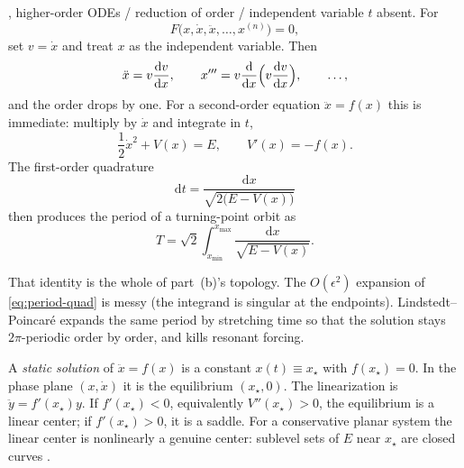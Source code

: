\documentclass[11pt,a4paper]{article}
\begin{document}
\begin{definition}
\label{def:reduce-autonomous}
\cite{grade2ode}, higher-order ODEs / reduction of order / independent variable \(t\) absent. For
\[
F\bigl(x,\dot x,\ddot x,\ldots,x^{(n)}\bigr)=0,
\]
set \(v=\dot x\) and treat \(x\) as the independent variable. Then
\[
\ddot x=v\frac{\mathrm{d}v}{\mathrm{d}x},\qquad
x'''=v\frac{\mathrm{d}}{\mathrm{d}x}\Bigl(v\frac{\mathrm{d}v}{\mathrm{d}x}\Bigr),\qquad
\ldots,
\]
and the order drops by one. For a second-order equation \(\ddot x=f(x)\) this is immediate: multiply by \(\dot x\) and integrate in \(t\),
\begin{equation}
\label{eq:energy}
\frac12\dot x^{2}+V(x)=E,
\qquad
V'(x)=-f(x).
\end{equation}
The first-order quadrature
\[
\mathrm{d}t=\frac{\mathrm{d}x}{\sqrt{2\bigl(E-V(x)\bigr)}}
\]
then produces the period of a turning-point orbit as
\begin{equation}
\label{eq:period-quad}
T
=
\sqrt{2}\int_{x_{\min}}^{x_{\max}}\frac{\mathrm{d}x}{\sqrt{E-V(x)}}.
\end{equation}
\end{definition}

That identity is the whole of part~(b)'s topology. The \(O(\epsilon^{2})\) expansion of \eqref{eq:period-quad} is messy (the integrand is singular at the endpoints). Lindstedt--Poincar\'e expands the same period by stretching time so that the solution stays \(2\pi\)-periodic order by order, and kills resonant forcing.

\begin{definition}
\label{def:static}
A \emph{static solution} of \(\ddot x=f(x)\) is a constant \(x(t)\equiv x_{\star}\) with \(f(x_{\star})=0\). In the phase plane \((x,\dot x)\) it is the equilibrium \((x_{\star},0)\). The linearization is \(\ddot y=f'(x_{\star})y\). If \(f'(x_{\star})<0\), equivalently \(V''(x_{\star})>0\), the equilibrium is a linear center; if \(f'(x_{\star})>0\), it is a saddle. For a conservative planar system the linear center is nonlinearly a genuine center: sublevel sets of \(E\) near \(x_{\star}\) are closed curves \cite{grade2ode}.
\end{definition}
\end{document}
